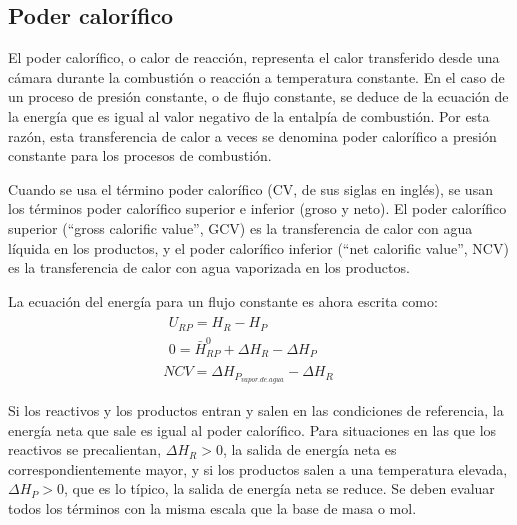 \subsection{Poder calorífico}
\par El poder calorífico, o calor de reacción, representa el calor transferido desde una cámara durante la combustión o reacción a temperatura constante. En el caso de un proceso de presión constante, o de flujo constante, se deduce de la ecuación de la energía que es igual al valor negativo de la entalpía de combustión. Por esta razón, esta transferencia de calor a veces se denomina poder calorífico a presión constante para los procesos de combustión.
\par Cuando se usa el término poder calorífico (CV, de sus siglas en inglés), se usan los términos poder calorífico superior e inferior (groso y neto). El poder calorífico superior (``gross calorific value'', GCV) es la transferencia de calor con agua líquida en los productos, y el poder calorífico inferior (``net calorific value'', NCV) es la transferencia de calor con agua vaporizada en los productos.
\par La ecuación del energía para un flujo constante es ahora escrita como:
\begin{gather}
\label{eq:cv}
\begin{gathered}
U_{RP} = H_R - H_P \quad\quad\quad\quad\quad\quad\\
0 = \bar H^0_{RP} + \Delta H_R - \Delta H_P
\end{gathered}\\
 NCV = \Delta H_{P_{vapor.de.agua}} - \Delta H_R \quad
\end{gather}
\par Si los reactivos y los productos entran y salen en las condiciones de referencia, la energía neta que sale es igual al poder calorífico. Para situaciones en las que los reactivos se precalientan, $\Delta H_R > 0$, la salida de energía neta es correspondientemente mayor, y si los productos salen a una temperatura elevada, $\Delta H_P > 0$, que es lo típico, la salida de energía neta se reduce. Se deben evaluar todos los términos con la misma escala que la base de masa o mol.

